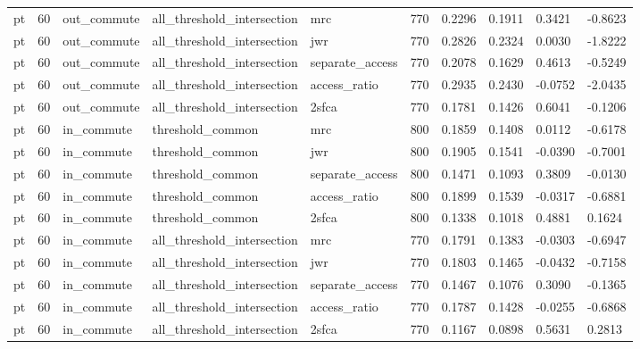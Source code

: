 \begin{table}[htbp]
\begin{tabular}{llllllllll}
pt & 60 & out\_commute & all\_threshold\_intersection & mrc & 770 & 0.2296 & 0.1911 & 0.3421 & -0.8623 \\
pt & 60 & out\_commute & all\_threshold\_intersection & jwr & 770 & 0.2826 & 0.2324 & 0.0030 & -1.8222 \\
pt & 60 & out\_commute & all\_threshold\_intersection & separate\_access & 770 & 0.2078 & 0.1629 & 0.4613 & -0.5249 \\
pt & 60 & out\_commute & all\_threshold\_intersection & access\_ratio & 770 & 0.2935 & 0.2430 & -0.0752 & -2.0435 \\
pt & 60 & out\_commute & all\_threshold\_intersection & 2sfca & 770 & 0.1781 & 0.1426 & 0.6041 & -0.1206 \\
pt & 60 & in\_commute & threshold\_common & mrc & 800 & 0.1859 & 0.1408 & 0.0112 & -0.6178 \\
pt & 60 & in\_commute & threshold\_common & jwr & 800 & 0.1905 & 0.1541 & -0.0390 & -0.7001 \\
pt & 60 & in\_commute & threshold\_common & separate\_access & 800 & 0.1471 & 0.1093 & 0.3809 & -0.0130 \\
pt & 60 & in\_commute & threshold\_common & access\_ratio & 800 & 0.1899 & 0.1539 & -0.0317 & -0.6881 \\
pt & 60 & in\_commute & threshold\_common & 2sfca & 800 & 0.1338 & 0.1018 & 0.4881 & 0.1624 \\
pt & 60 & in\_commute & all\_threshold\_intersection & mrc & 770 & 0.1791 & 0.1383 & -0.0303 & -0.6947 \\
pt & 60 & in\_commute & all\_threshold\_intersection & jwr & 770 & 0.1803 & 0.1465 & -0.0432 & -0.7158 \\
pt & 60 & in\_commute & all\_threshold\_intersection & separate\_access & 770 & 0.1467 & 0.1076 & 0.3090 & -0.1365 \\
pt & 60 & in\_commute & all\_threshold\_intersection & access\_ratio & 770 & 0.1787 & 0.1428 & -0.0255 & -0.6868 \\
pt & 60 & in\_commute & all\_threshold\_intersection & 2sfca & 770 & 0.1167 & 0.0898 & 0.5631 & 0.2813 \\
\bottomrule
\end{tabular}
\end{table}
